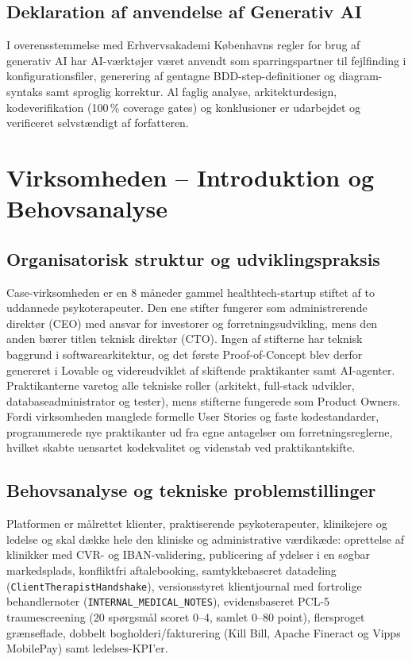 \documentclass[11pt,a4paper]{article}
\begin{document}
\begin{table}[htbp]
\subsection{Deklaration af anvendelse af Generativ AI}
I overensstemmelse med Erhvervsakademi Københavns regler for brug af generativ AI \cite{ek_ai_regler2024, ek_genai_rammer2024} har AI-værktøjer været anvendt som sparringspartner til fejlfinding i konfigurationsfiler, generering af gentagne BDD-step-definitioner og diagram-syntaks samt sproglig korrektur. Al faglig analyse, arkitekturdesign, kodeverifikation (100\,\% coverage gates) og konklusioner er udarbejdet og verificeret selvstændigt af forfatteren.

\section{Virksomheden -- Introduktion og Behovsanalyse}

\subsection{Organisatorisk struktur og udviklingspraksis}
Case-virksomheden er en 8 måneder gammel healthtech-startup stiftet af to uddannede psykoterapeuter. Den ene stifter fungerer som administrerende direktør (CEO) med ansvar for investorer og forretningsudvikling, mens den anden bærer titlen teknisk direktør (CTO). Ingen af stifterne har teknisk baggrund i softwarearkitektur, og det første Proof-of-Concept blev derfor genereret i Lovable og videreudviklet af skiftende praktikanter samt AI-agenter. Praktikanterne varetog alle tekniske roller (arkitekt, full-stack udvikler, databaseadministrator og tester), mens stifterne fungerede som Product Owners. Fordi virksomheden manglede formelle User Stories og faste kodestandarder, programmerede nye praktikanter ud fra egne antagelser om forretningsreglerne, hvilket skabte uensartet kodekvalitet og videnstab ved praktikantskifte.

\subsection{Behovsanalyse og tekniske problemstillinger}
Platformen er målrettet klienter, praktiserende psykoterapeuter, klinikejere og ledelse og skal dække hele den kliniske og administrative værdikæde: oprettelse af klinikker med CVR- og IBAN-validering, publicering af ydelser i en søgbar markedsplads, konfliktfri aftalebooking, samtykkebaseret datadeling (\texttt{ClientTherapistHandshake}), versionsstyret klientjournal med fortrolige behandlernoter (\texttt{INTERNAL\_MEDICAL\_NOTES}), evidensbaseret PCL-5 traumescreening (20 spørgsmål scoret 0--4, samlet 0--80 point), flersproget grænseflade, dobbelt bogholderi/fakturering (Kill Bill, Apache Fineract og Vipps MobilePay) samt ledelses-KPI'er.


\end{table}
\end{document}
